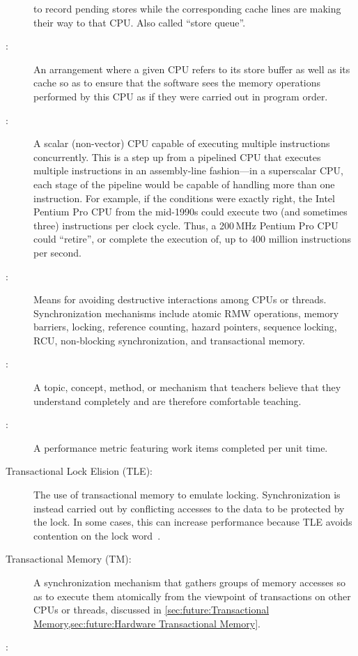 \begin{description}
	to record pending stores
	while the corresponding cache lines are making their
	way to that CPU\@.
	Also called ``store queue''.
\item[\IXG{Store Forwarding}:]
	An arrangement where a given CPU refers to its store buffer
	as well as its cache so as to ensure that the software sees
	the memory operations performed by this CPU as if they
	were carried out in program order.
\item[\IXGr{Superscalar CPU}:]
	A scalar (non-vector) CPU capable of executing multiple instructions
	concurrently.
	This is a step up from a pipelined CPU that executes multiple
	instructions in an assembly-line fashion---in a superscalar
	CPU, each stage of the pipeline would be capable of handling
	more than one instruction.
	For example, if the conditions were exactly right,
	the Intel Pentium Pro CPU from the mid-1990s could
	execute two (and sometimes three) instructions per clock cycle.
	Thus, a 200\,MHz Pentium Pro CPU could ``retire'', or complete the
	execution of, up to 400 million instructions per second.
\item[\IXG{Synchronization}:]
	Means for avoiding destructive interactions among CPUs or threads.
	Synchronization mechanisms include atomic RMW operations, memory
	barriers, locking, reference counting, hazard pointers, sequence
	locking, RCU, non-blocking synchronization, and transactional
	memory.
\item[\IXG{Teachable}:]
	A topic, concept, method, or mechanism that teachers believe that
	they understand completely and are therefore comfortable teaching.
\item[\IXG{Throughput}:]
	A performance metric featuring work items completed per unit time.
\item[Transactional Lock Elision (TLE):]
	The use of transactional memory to emulate locking.
	Synchronization is instead carried out by conflicting accesses
	to the data to be protected by the lock.
	In some cases, this can increase performance because TLE
	avoids contention on the lock
	word~\cite{MartinPohlack2011HTM2TLE,Kleen:2014:SEL:2566590.2576793,PascalFelber2016rwlockElision,SeongJaePark2020HTMRCUlock}.
\item[Transactional Memory (TM):]
	A synchronization mechanism that gathers groups of memory
	accesses so as to execute them atomically from the viewpoint
	of transactions on other CPUs or threads, discussed in
	\cref{sec:future:Transactional Memory,sec:future:Hardware Transactional Memory}.
\item[\IXG{Type-Safe Memory}:]

\end{description}
